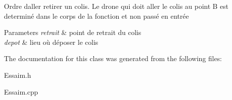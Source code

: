 Ordre d\textquotesingle{}aller retirer un colis. Le drone qui doit aller le colis au point B est determiné dans le corps de la fonction et non passé en entrée 
\begin{DoxyParams}{Parameters}
{\em retrait} & point de retrait du colis \\
\hline
{\em depot} & lieu où déposer le colis \\
\hline
\end{DoxyParams}


The documentation for this class was generated from the following files\+:\begin{DoxyCompactItemize}
\item 
Essaim.\+h\item 
Essaim.\+cpp\end{DoxyCompactItemize}

